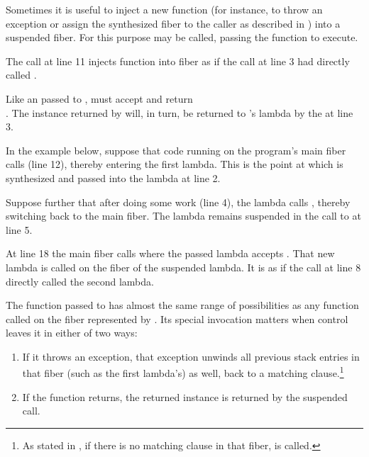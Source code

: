 \label{resumewith}
Sometimes it is useful to inject a new function (for instance, to throw an
exception or assign the synthesized fiber to the caller as described in
) into a suspended fiber. For this purpose
\anyresumewith may be called, passing the function  to execute.


The \resumewith call at line 11 injects function  into
fiber  as if the \resume call at line 3 had directly
called .

Like an \entryfn passed to \fiber,  must accept
 and return\\
\fiber. The \fiber instance returned by  will, in turn, be returned
to 's lambda by the \resume at line 3.

In the example below, suppose that code running on the program's main fiber
calls \resume (line 12), thereby entering the first lambda. This is the point
at which  is synthesized and passed into the lambda at line 2.

Suppose further that after doing some work (line 4), the lambda calls
, thereby switching back to the main fiber. The lambda remains
suspended in the call to  at line 5.

At line 18 the main fiber calls  where the passed lambda
accepts . That new lambda is called on the fiber of the suspended
lambda. It is as if the  call at line 8 directly called the second
lambda.

The function passed to \resumewith has almost the same range of possibilities as
any function called on the fiber represented by . Its special invocation
matters when control leaves it in either of two ways:

\begin{enumerate}
  \item If it throws an exception, that exception unwinds all previous stack
        entries in that fiber (such as the first lambda's) as well, back to
        a matching  clause.\footnote{As stated
        in , if there is no matching 
        clause in that fiber,  is called.}
  \item If the function returns, the returned \fiber instance is returned by
        the suspended \anyresume call.
\end{enumerate}

